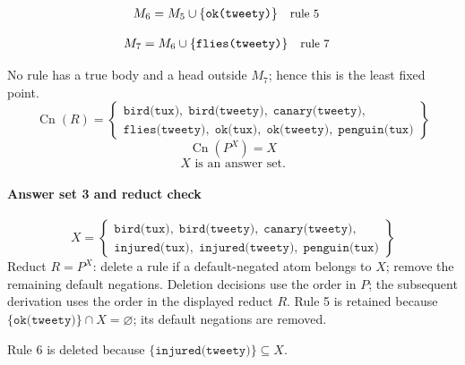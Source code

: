 \documentclass[a4paper,11pt]{article}
\newif\ifexplain
\newcommand{\explain}[1]{\ifexplain\begin{erklbox}#1\end{erklbox}\fi}
\newcommand{\why}[1]{\text{\small #1}}
\newcommand{\at}[1]{\texttt{#1}}
\begin{document}
\explain{Für $\at{ok(tux)}$ brauchen wir $\at{bird(tux)}$. Weil diese Voraussetzungen bereits hergeleitet sind, dürfen wir den Regelkopf jetzt aufnehmen und alle bisherigen Atome behalten; bei einer fehlenden Voraussetzung würde diese Regel dagegen noch nichts beitragen.}
\begin{align*}
M_{6} &= M_{5}\cup \{\at{ok(tweety)}\} && \why{rule 5}
\end{align*}
\explain{Für $\at{ok(tweety)}$ brauchen wir $\at{bird(tweety)}$. Weil diese Voraussetzungen bereits hergeleitet sind, dürfen wir den Regelkopf jetzt aufnehmen und alle bisherigen Atome behalten; bei einer fehlenden Voraussetzung würde diese Regel dagegen noch nichts beitragen.}
\begin{align*}
M_{7} &= M_{6}\cup \{\at{flies(tweety)}\} && \why{rule 7}
\end{align*}
\explain{Für $\at{flies(tweety)}$ brauchen wir $\at{ok(tweety)}$. Weil diese Voraussetzungen bereits hergeleitet sind, dürfen wir den Regelkopf jetzt aufnehmen und alle bisherigen Atome behalten; bei einer fehlenden Voraussetzung würde diese Regel dagegen noch nichts beitragen.}
No rule has a true body and a head outside $M_{7}$; hence this is the least fixed point.
\[
\operatorname{Cn}(R)=\left\{\begin{gathered}\at{bird(tux)},\;\at{bird(tweety)},\;\at{canary(tweety)},\\\at{flies(tweety)},\;\at{ok(tux)},\;\at{ok(tweety)},\;\at{penguin(tux)}\end{gathered}\right\}
\]
\[
\operatorname{Cn}(P^X)=X
\]
\[
\boxed{X\text{ is an answer set.}}
\]
\paragraph{Answer set 3 and reduct check}
\[
X=\left\{\begin{gathered}\at{bird(tux)},\;\at{bird(tweety)},\;\at{canary(tweety)},\\\at{injured(tux)},\;\at{injured(tweety)},\;\at{penguin(tux)}\end{gathered}\right\}
\]
Reduct $R=P^X$: delete a rule if a default-negated atom belongs to $X$; remove the remaining default negations. Deletion decisions use the order in $P$; the subsequent derivation uses the order in the displayed reduct $R$.
Rule 5 is retained because $\{\at{ok(tweety)}\}\cap X=\varnothing$; its default negations are removed.

Rule 6 is deleted because $\{\at{injured(tweety)}\}\subseteq X$.
\end{document}
